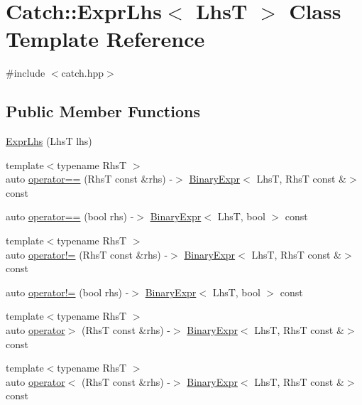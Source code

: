 \hypertarget{class_catch_1_1_expr_lhs}{}\section{Catch\+:\+:Expr\+Lhs$<$ LhsT $>$ Class Template Reference}
\label{class_catch_1_1_expr_lhs}


{\ttfamily \#include $<$catch.\+hpp$>$}

\subsection*{Public Member Functions}
\begin{DoxyCompactItemize}
\item 
\mbox{\hyperlink{class_catch_1_1_expr_lhs_ad22c6af1a7d6993240624d299714a479}{Expr\+Lhs}} (LhsT lhs)
\item 
{\footnotesize template$<$typename RhsT $>$ }\\auto \mbox{\hyperlink{class_catch_1_1_expr_lhs_a3068adff1dbbaeec62ffc368d4d6cc4d}{operator==}} (RhsT const \&rhs) -\/$>$ \mbox{\hyperlink{class_catch_1_1_binary_expr}{Binary\+Expr}}$<$ LhsT, RhsT const \&$>$ const
\item 
auto \mbox{\hyperlink{class_catch_1_1_expr_lhs_ab707a84abdffbdc35962a495e238d393}{operator==}} (bool rhs) -\/$>$ \mbox{\hyperlink{class_catch_1_1_binary_expr}{Binary\+Expr}}$<$ LhsT, bool $>$ const
\item 
{\footnotesize template$<$typename RhsT $>$ }\\auto \mbox{\hyperlink{class_catch_1_1_expr_lhs_a5e10eab8aed53dd000b89d8fd7754437}{operator!=}} (RhsT const \&rhs) -\/$>$ \mbox{\hyperlink{class_catch_1_1_binary_expr}{Binary\+Expr}}$<$ LhsT, RhsT const \&$>$ const
\item 
auto \mbox{\hyperlink{class_catch_1_1_expr_lhs_a60eca847201d057d8a8b7222c69b619c}{operator!=}} (bool rhs) -\/$>$ \mbox{\hyperlink{class_catch_1_1_binary_expr}{Binary\+Expr}}$<$ LhsT, bool $>$ const
\item 
{\footnotesize template$<$typename RhsT $>$ }\\auto \mbox{\hyperlink{class_catch_1_1_expr_lhs_a23cb0cd983a1ac9c3df5160542199b83}{operator$>$}} (RhsT const \&rhs) -\/$>$ \mbox{\hyperlink{class_catch_1_1_binary_expr}{Binary\+Expr}}$<$ LhsT, RhsT const \&$>$ const
\item 
{\footnotesize template$<$typename RhsT $>$ }\\auto \mbox{\hyperlink{class_catch_1_1_expr_lhs_a55284221df2edb3542e765c87b5691b9}{operator$<$}} (RhsT const \&rhs) -\/$>$ \mbox{\hyperlink{class_catch_1_1_binary_expr}{Binary\+Expr}}$<$ LhsT, RhsT const \&$>$ const

\end{DoxyCompactItemize}
